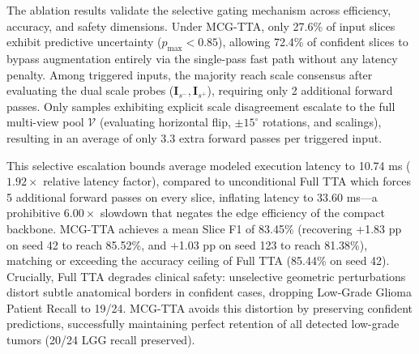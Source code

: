 ﻿\documentclass[journal]{IEEEtran}
\begin{document}
\begin{table}[t]
\caption{Ablation of Test-Time Augmentation (TTA) Strategies on LS-Net (BraTS 2020)}\label{tab:ablation}
\centering\scriptsize
{}
\end{table}

The ablation results validate the selective gating mechanism across efficiency, accuracy, and safety dimensions. Under MCG-TTA, only 27.6\% of input slices exhibit predictive uncertainty ($p_{\max} < 0.85$), allowing 72.4\% of confident slices to bypass augmentation entirely via the single-pass fast path without any latency penalty. Among triggered inputs, the majority reach scale consensus after evaluating the dual scale probes ($\mathbf{I}_{s^-}, \mathbf{I}_{s^+}$), requiring only 2 additional forward passes. Only samples exhibiting explicit scale disagreement escalate to the full multi-view pool $\mathcal{V}$ (evaluating horizontal flip, $\pm 15^\circ$ rotations, and scalings), resulting in an average of only 3.3 extra forward passes per triggered input.

This selective escalation bounds average modeled execution latency to 10.74 ms ($1.92\times$ relative latency factor), compared to unconditional Full TTA which forces 5 additional forward passes on every slice, inflating latency to 33.60 ms---a prohibitive $6.00\times$ slowdown that negates the edge efficiency of the compact backbone. MCG-TTA achieves a mean Slice F1 of 83.45\% (recovering +1.83 pp on seed 42 to reach 85.52\%, and +1.03 pp on seed 123 to reach 81.38\%), matching or exceeding the accuracy ceiling of Full TTA (85.44\% on seed 42). Crucially, Full TTA degrades clinical safety: unselective geometric perturbations distort subtle anatomical borders in confident cases, dropping Low-Grade Glioma Patient Recall to 19/24. MCG-TTA avoids this distortion by preserving confident predictions, successfully maintaining perfect retention of all detected low-grade tumors (20/24 LGG recall preserved).
\end{document}
